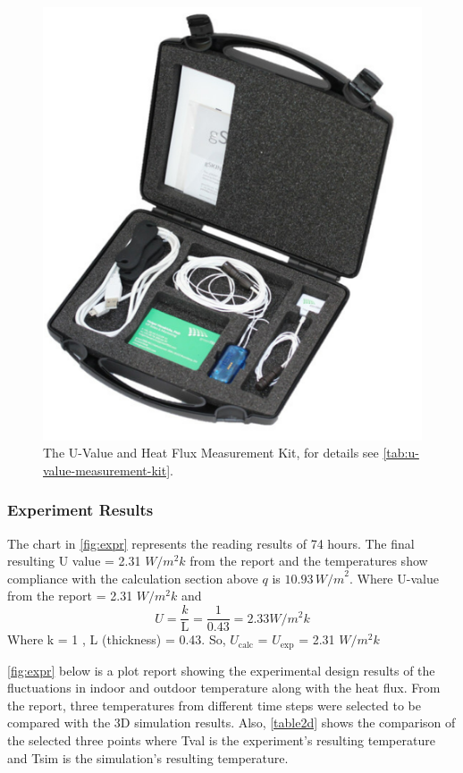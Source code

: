 \begin{figure}[tbh]
     \centering
    \includegraphics[width=0.5\linewidth]{Figures/greenteg.png}
     \caption[U-value measurement Kit]{The U-Value and Heat Flux Measurement Kit, for details see \cref{tab:u-value-measurement-kit}.}
   \label{fig:toolkit}
 \end{figure}






\subsubsection{Experiment Results}
The chart in \ref{fig:expr} represents the reading results of 74 hours. The final resulting U value = 2.31 ${W/m^2k}$ from the report and the temperatures show compliance with the calculation section above \( q \) is \( 10.93 \, {W/m}^2 \). 
Where U-value from the report = 2.31 ${W/m^2k}$ and 
\begin{equation}
    U = \frac{k}{\text{L}}
      = \frac{1}{\text{0.43}} = 2.33  {W/m^2k}
\end{equation}
Where k = 1 , L (thickness) = 0.43. So, \(U_{\text{calc}}\) = \(U_{\text{exp}}\) = 2.31 ${W/m^2k}$ 

\ref{fig:expr} below is a plot report showing the experimental design results of the fluctuations in indoor and outdoor temperature along with the heat flux. From the report, three temperatures from different time steps were selected to be compared with the 3D simulation results. Also, \ref{table2d} shows the comparison of the selected three points where Tval is the experiment's resulting temperature and Tsim is the simulation's resulting temperature.

